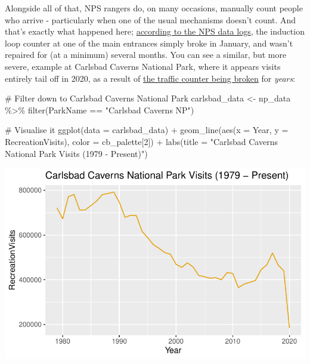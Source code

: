 \documentclass[
  letterpaper,
  DIV=11,
  numbers=noendperiod]{scrartcl}
\newenvironment{Shaded}{\begin{snugshade}}{\end{snugshade}}
\newcommand{\AttributeTok}[1]{\textcolor[rgb]{0.40,0.45,0.13}{#1}}
\newcommand{\CommentTok}[1]{\textcolor[rgb]{0.37,0.37,0.37}{#1}}
\newcommand{\DecValTok}[1]{\textcolor[rgb]{0.68,0.00,0.00}{#1}}
\newcommand{\FunctionTok}[1]{\textcolor[rgb]{0.28,0.35,0.67}{#1}}
\newcommand{\NormalTok}[1]{\textcolor[rgb]{0.00,0.23,0.31}{#1}}
\newcommand{\OtherTok}[1]{\textcolor[rgb]{0.00,0.23,0.31}{#1}}
\newcommand{\SpecialCharTok}[1]{\textcolor[rgb]{0.37,0.37,0.37}{#1}}
\newcommand{\StringTok}[1]{\textcolor[rgb]{0.13,0.47,0.30}{#1}}
\begin{document}
Alongside all of that, NPS rangers do, on many occasions, manually count
people who arrive - particularly when one of the usual mechanisms
doesn't count. And that's exactly what happened here;
\href{https://irma.nps.gov/Stats/SSRSReports/Park\%20Specific\%20Reports/Monthly\%20Visitation\%20Comments\%20By\%20Park?Park=CRLA}{according
to the NPS data logs}, the induction loop counter at one of the main
entrances simply broke in January, and wasn't repaired for (at a
minimum) several months. You can see a similar, but more severe, example
at Carlsbad Caverns National Park, where it appears visits entirely tail
off in 2020, as a result of
\href{https://irma.nps.gov/Stats/SSRSReports/Park\%20Specific\%20Reports/Monthly\%20Visitation\%20Comments\%20By\%20Park?Park=CRLA}{the
traffic counter being broken} for \emph{years}:

\begin{Shaded}
\begin{Highlighting}[]
\CommentTok{\# Filter down to Carlsbad Caverns National Park}
\NormalTok{carlsbad\_data }\OtherTok{\textless{}{-}}\NormalTok{ np\_data }\SpecialCharTok{\%\textgreater{}\%} \FunctionTok{filter}\NormalTok{(ParkName }\SpecialCharTok{==} \StringTok{"Carlsbad Caverns NP"}\NormalTok{)}

\CommentTok{\# Visualise it}
\FunctionTok{ggplot}\NormalTok{(}\AttributeTok{data =}\NormalTok{ carlsbad\_data) }\SpecialCharTok{+} 
  \FunctionTok{geom\_line}\NormalTok{(}\FunctionTok{aes}\NormalTok{(}\AttributeTok{x =}\NormalTok{ Year, }\AttributeTok{y =}\NormalTok{ RecreationVisits), }\AttributeTok{color =}\NormalTok{ cb\_palette[}\DecValTok{2}\NormalTok{]) }\SpecialCharTok{+} 
  \FunctionTok{labs}\NormalTok{(}\AttributeTok{title =} \StringTok{"Carlsbad Caverns National Park Visits (1979 {-} Present)"}\NormalTok{)}
\end{Highlighting}
\end{Shaded}

\includegraphics{index_files/figure-pdf/unnamed-chunk-4-1.pdf}
\end{document}

